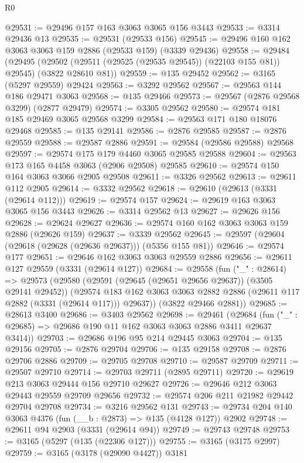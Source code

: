 \begin{lexlean}{R0}
\begin{coremodule}
@29531 := @29496 @157 @163 @3063 @3065 @156 @3443
@29533 := @3314 @29436 @13
@29535 := @29531 (@29533 @156)
@29545 := @29496 @160 @162 @3063 @3063 @159 @2886 (@29533 @159) (@3339 @29436)
@29558 := @29484
    (@29495 (@29502 (@29511 (@29525 (@29535 @29545)) (@22103 @155 @81)) @29545) (@3822 @28610 @81))
@29559 := @135 @29452
@29562 := @3165 (@5297 @29559) @29424
@29563 := @3292 @29562
@29567 := @29563 @144 @186 @29471 @3063
@29568 := @135 @29466
@29573 := @29567 (@2876 @29568 @3299) (@2877 @29479)
@29574 := @3305 @29562
@29580 := @29574 @181 @185 @29469 @3065 @29568 @3299
@29584 := @29563 @171 @180 @18076 @29468
@29585 := @135 @29141
@29586 := @2876 @29585
@29587 := @2876 @29559
@29588 := @29587 @2886
@29591 := @29584 (@29586 @29588) @29568
@29597 := @29574 @175 @179 @4460 @3065 @29585 @29588
@29604 := @29563 @173 @165 @4458 @3063 (@2906 @29508) @29585
@29610 := @29574 @150 @164 @3063 @3066 @2905 @29508
@29611 := @3326 @29562
@29613 := @29611 @112 @2905
@29614 := @3332 @29562
@29618 := @29610 (@29613 (@3331 (@29614 @112)))
@29619 := @29574 @157
@29624 := @29619 @163 @3063 @3065 @156 @3443
@29626 := @3314 @29562 @13
@29627 := @29626 @156
@29628 := @29624 @29627
@29636 := @29574 @160 @162 @3063 @3063 @159 @2886 (@29626 @159)
@29637 := @3339 @29562
@29645 := @29597 (@29604 (@29618 (@29628 (@29636 @29637))) (@5356 @155 @81))
@29646 := @29574 @177
@29651 := @29646 @162 @3063 @3063 @29559 @2886
@29656 := @29611 @127 @29559 (@3331 (@29614 @127))
@29684 := @29558
    (fun ("_" : @28614) =>
    @29573
      (@29580
        (@29591 (@29645 (@29651 @29656 @29637)) (@3505 @29141 @29452))
        (@29574 @183 @162 @3063 @3063 @2882 @2886 (@29611 @117 @2882 (@3331 (@29614 @117))) @29637))
      (@3822 @29466 @2881))
@29685 := @28613 @3400
@29686 := @3403 @29562
@29698 := @29461
    (@29684 (fun ("_" : @29685) => @29686 @190 @11 @162 @3063 @3063 @2886 @3411 @29637 @3414))
@29703 := @29686 @196 @95 @214 @29445 @3063
@29704 := @135 @29156
@29705 := @2876 @29704
@29706 := @135 @29158
@29708 := @2876 @29706 @2886
@29709 := @29705 @29708
@29710 := @29587 @29709
@29711 := @29507 @29710
@29714 := @29703 @29711 (@2895 @29711)
@29720 := @29619 @213 @3063 @29444 @156 @29710 @29627
@29726 := @29646 @212 @3063 @29443 @29559 @29709 @29656
@29732 := @29574 @206 @211 @21982 @29442 @29704 @29708
@29734 := @3216 @29562 @131
@29743 := @29734 @204 @140 @3063 @4376 (fun (__b : @2873) => @135 (@4128 @127)) @2902
@29748 := @29611 @94 @2903 (@3331 (@29614 @94))
@29749 := @29743 @29748
@29753 := @3165 (@5297 (@135 (@22306 @127)))
@29755 := @3165 (@3175 @2997)
@29759 := @3165 (@3178 (@29090 @4427)) @3181

\end{coremodule}
\end{lexlean}
